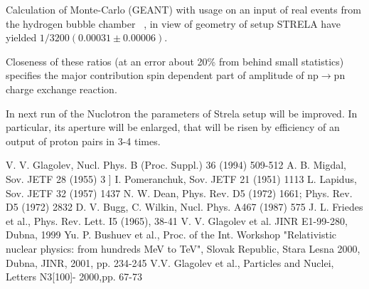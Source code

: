 \documentclass[a4paper,12pt]{article}
\begin{document}
Calculation of Monte-Carlo (GEANT) with usage on an input of real events from
the hydrogen bubble chamber~\cite{a10} , in view of geometry of setup STRELA
have yielded $1/3200 (0.00031\pm 0.00006)$.

Closeness of these ratios (at an error about 20\% from behind small statistics)
specifies the major contribution spin dependent part of amplitude of np$\to$pn
charge exchange reaction.

In next run of the Nuclotron the parameters of Strela setup will be improved.
In particular, its aperture will be enlarged, that  will be risen by efficiency
of an output of proton pairs in 3-4 times.

\begin{thebibliography}{99}

 V. V. Glagolev, Nucl. Phys. B (Proc. Suppl.) 36 (1994) 509-512
 A. B. Migdal, Sov. JETF 28 (1955) 3
 ] I. Pomeranchuk, Sov. JETF 21 (1951) 1113
 L. Lapidus, Sov. JETF 32 (1957) 1437
 N. W. Dean, Phys. Rev. D5 (1972) 1661; Phys. Rev. D5 (1972) 2832
 D. V. Bugg, C. Wilkin, Nucl. Phys. A467 (1987) 575
 J. L. Friedes et al., Phys. Rev. Lett. I5 (1965), 38-41
 V. V. Glagolev et al. JINR E1-99-280, Dubna, 1999
 Yu. P. Bushuev et al., Proc. of the Int. Workshop "Relativistic
  nuclear physics: from hundreds MeV to TeV", Slovak Republic, Stara Lesna 2000,
  Dubna, JINR, 2001, pp. 234-245
 V.V. Glagolev et al., Particles and Nuclei, Letters N3[100]-
  2000,pp. 67-73

\end{thebibliography}
\end{document}
